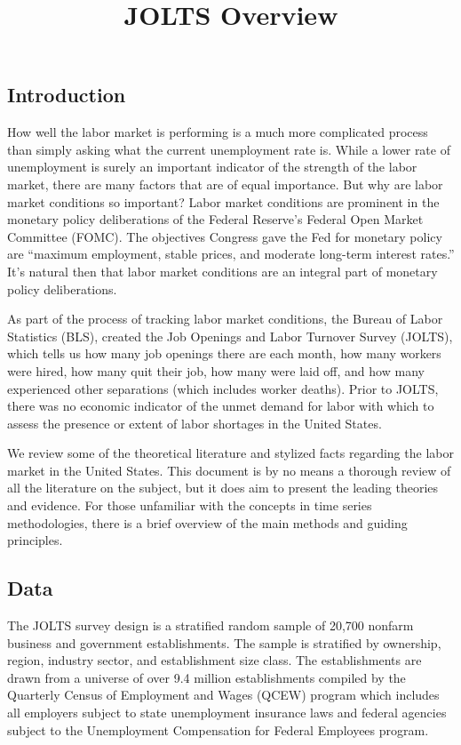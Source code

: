 \documentclass[
  11pt,
]{article}
\title{JOLTS Overview}
\author{}
\date{\vspace{-2.5em}}
\begin{document}
\maketitle

\hypertarget{introduction}{%
\subsection{Introduction}\label{introduction}}

How well the labor market is performing is a much more complicated
process than simply asking what the current unemployment rate is. While
a lower rate of unemployment is surely an important indicator of the
strength of the labor market, there are many factors that are of equal
importance. But why are labor market conditions so important? Labor
market conditions are prominent in the monetary policy deliberations of
the Federal Reserve's Federal Open Market Committee (FOMC). The
objectives Congress gave the Fed for monetary policy are ``maximum
employment, stable prices, and moderate long-term interest rates.'' It's
natural then that labor market conditions are an integral part of
monetary policy deliberations.

As part of the process of tracking labor market conditions, the Bureau
of Labor Statistics (BLS), created the Job Openings and Labor Turnover
Survey (JOLTS), which tells us how many job openings there are each
month, how many workers were hired, how many quit their job, how many
were laid off, and how many experienced other separations (which
includes worker deaths). Prior to JOLTS, there was no economic indicator
of the unmet demand for labor with which to assess the presence or
extent of labor shortages in the United States.

We review some of the theoretical literature and stylized facts
regarding the labor market in the United States. This document is by no
means a thorough review of all the literature on the subject, but it
does aim to present the leading theories and evidence. For those
unfamiliar with the concepts in time series methodologies, there is a
brief overview of the main methods and guiding principles.

\hypertarget{data}{%
\subsection{Data}\label{data}}

The JOLTS survey design is a stratified random sample of 20,700 nonfarm
business and government establishments. The sample is stratified by
ownership, region, industry sector, and establishment size class. The
establishments are drawn from a universe of over 9.4 million
establishments compiled by the Quarterly Census of Employment and Wages
(QCEW) program which includes all employers subject to state
unemployment insurance laws and federal agencies subject to the
Unemployment Compensation for Federal Employees program.
\end{document}
